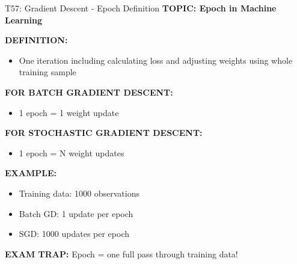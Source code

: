 \documentclass[8pt]{beamer}
\begin{document}
	\begin{frame}{T57: Gradient Descent - Epoch Definition}
		\fontsize{6.5}{7.5}\selectfont
		\textbf{TOPIC: Epoch in Machine Learning}
		
		\vspace{0.1cm}
		\textbf{DEFINITION:}
		\begin{itemize}
			\item One iteration including calculating loss and adjusting weights using whole training sample
		\end{itemize}
		
		\vspace{0.1cm}
		\textbf{FOR BATCH GRADIENT DESCENT:}
		\begin{itemize}
			\item 1 epoch = 1 weight update
		\end{itemize}
		
		\vspace{0.1cm}
		\textbf{FOR STOCHASTIC GRADIENT DESCENT:}
		\begin{itemize}
			\item 1 epoch = N weight updates
		\end{itemize}
		
		\vspace{0.1cm}
		\textbf{EXAMPLE:}
		\begin{itemize}
			\item Training data: 1000 observations
			\item Batch GD: 1 update per epoch
			\item SGD: 1000 updates per epoch
		\end{itemize}
		
		\textcolor{myred}{\textbf{EXAM TRAP:}} Epoch = \textcolor{myblue}{one full pass} through training data!
	\end{frame}
	
\end{document}
